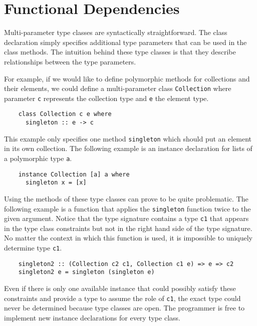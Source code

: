 \section{Functional Dependencies}
Multi-parameter type classes are syntactically straightforward. The class
declaration simply specifies additional type parameters that can be used
in the class methods. The intuition behind these type classes is that they
describe relationships between the type parameters.

For example, if we would like to define polymorphic methods for collections and their
elements, we could define a multi-parameter class \texttt{Collection} where
parameter \texttt{c} represents the collection type and \texttt{e} the
element type.
\begin{verbatim}
    class Collection c e where
      singleton :: e -> c
\end{verbatim}
This example only specifies one method \texttt{singleton} which
should put an element in its own collection.
The following example is an instance declaration for lists of a polymorphic type
\texttt{a}.
\begin{verbatim}
    instance Collection [a] a where
      singleton x = [x]
\end{verbatim}

Using the methods of these type classes can prove to be quite problematic. The
following example is a function that applies the \texttt{singleton} function
twice to the given argument. Notice that the type signature contains a type
\texttt{c1} that appears in the type class constraints but not in the right hand
side of the type signature. No matter the context in which this function is
used, it is impossible to uniquely determine type \texttt{c1}.

\begin{verbatim}
    singleton2 :: (Collection c2 c1, Collection c1 e) => e => c2
    singleton2 e = singleton (singleton e)
\end{verbatim}

Even if there is only one available instance that could possibly satisfy these
constraints and provide a type to assume the role of \texttt{c1}, the exact
type could never be determined because type classes are open. The programmer
is free to implement new instance declarations for every type class.

